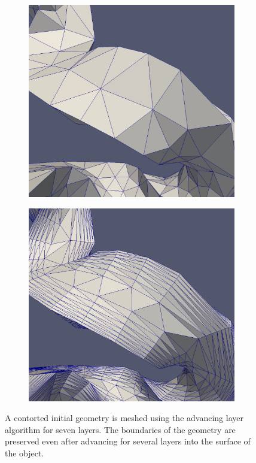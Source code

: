 \documentclass[conf]{new-aiaa}
\begin{document}
\begin{figure}[hbt!]
\begin{subfigure}{.5\textwidth}
  \caption{}
  \label{twist2}
\end{subfigure}
\begin{subfigure}{.5\textwidth}
  \centering
  \includegraphics[width=.9\linewidth]{twist/before1.eps}
  \caption{}
  \label{twist3}
\end{subfigure}%
\begin{subfigure}{.5\textwidth}
  \centering
  \includegraphics[width=.9\linewidth]{twist/after1.eps}
  \caption{}
  \label{twist4}
\end{subfigure}
\caption{A contorted initial geometry is meshed using the advancing layer algorithm for seven layers. The boundaries of the geometry are preserved even after advancing for several layers into the surface of the object.}
\label{twist}
\end{figure}
\end{document}

